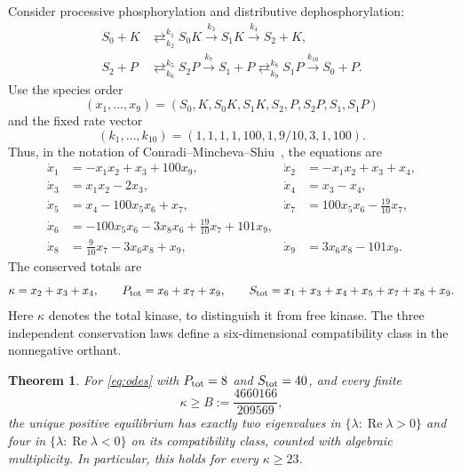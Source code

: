\documentclass[11pt]{article}
\newtheorem{theorem}{Theorem}
\begin{document}
Consider processive phosphorylation and distributive dephosphorylation:
\begin{align*}
 S_0+K&\mathrel{\mathop{\rightleftarrows}^{k_1}_{k_2}}S_0K
       \xrightarrow{k_3}S_1K\xrightarrow{k_4}S_2+K,\\
 S_2+P&\mathrel{\mathop{\rightleftarrows}^{k_5}_{k_6}}S_2P
       \xrightarrow{k_7}S_1+P
       \mathrel{\mathop{\rightleftarrows}^{k_8}_{k_9}}S_1P
       \xrightarrow{k_{10}}S_0+P.
\end{align*}
Use the species order
\[
 (x_1,\ldots,x_9)=(S_0,K,S_0K,S_1K,S_2,P,S_2P,S_1,S_1P)
\]
and the fixed rate vector
\begin{equation}\label{eq:rates}
 (k_1,\ldots,k_{10})=(1,1,1,1,100,1,9/10,3,1,100).
\end{equation}
Thus, in the notation of Conradi--Mincheva--Shiu~\cite{CMS}, the equations are
\begin{equation}\label{eq:odes}
\begin{aligned}
 \dot x_1&=-x_1x_2+x_3+100x_9,&
 \dot x_2&=-x_1x_2+x_3+x_4,\\
 \dot x_3&=x_1x_2-2x_3,& \dot x_4&=x_3-x_4,\\
 \dot x_5&=x_4-100x_5x_6+x_7,&
 \dot x_7&=100x_5x_6-\tfrac{19}{10}x_7,\\
 \dot x_6&=-100x_5x_6-3x_8x_6+\tfrac{19}{10}x_7+101x_9,\\
 \dot x_8&=\tfrac9{10}x_7-3x_6x_8+x_9,&
 \dot x_9&=3x_6x_8-101x_9.
\end{aligned}
\end{equation}
The conserved totals are
\begin{equation}\label{eq:totals}
 \kappa=x_2+x_3+x_4,\qquad P_{\rm tot}=x_6+x_7+x_9,\qquad
 S_{\rm tot}=x_1+x_3+x_4+x_5+x_7+x_8+x_9.
\end{equation}
Here $\kappa$ denotes the total kinase, to distinguish it from free kinase.
The three independent conservation laws define a six-dimensional
compatibility class in the nonnegative orthant.

\begin{theorem}\label{thm:main}
For \eqref{eq:odes} with $P_{\rm tot}=8$ and $S_{\rm tot}=40$, and every finite
\[
 \kappa\ge B:=\frac{4660166}{209569},
\]
the unique positive equilibrium has exactly two eigenvalues in
$\{\lambda:\operatorname{Re}\lambda>0\}$ and four in
$\{\lambda:\operatorname{Re}\lambda<0\}$ on its compatibility class,
counted with algebraic multiplicity. In particular, this holds for every
$\kappa\ge23$.
\end{theorem}
\end{document}
